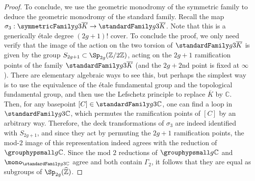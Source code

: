 \begin{proof}
	To conclude, we use the geometric monodromy of the symmetric
	family to deduce the geometric monodromy of the standard family.
	Recall the map $\sigma_3: \symmetricFamily g 3 {\overline K} \rightarrow \standardFamily g 3 {\overline K}$.
	Note that this is a generically \'etale degree $(2g+1)!$ cover.
	To conclude the proof, we only need verify that the image of the 
	action on the two torsion of $\standardFamily g 3 {\overline K}$
	is given by the group 
	$S_{2g+1} \subset \Sp_{2g}(\mathbb Z/2 \mathbb Z)$,
	acting on the
	$2g+1$ ramification
	points of the family $\standardFamily g 3 {\overline K}$ (and the $2g+2$nd point
	is fixed at $\infty$).
	There are elementary algebraic ways to see this, but perhaps
	the simplest way is to use the equivalence of the \'etale
	fundamental group and the topological fundamental group,
	and then use the Lefschetz principle to replace $\overline K$
	by $\mathbb C$.
	Then, for any basepoint $[C] \in\standardFamily g 3 {\mathbb C}$,
one can find a loop in $\standardFamily g 3 {\mathbb C}$,
which permutes the ramification points of $[C]$ by an arbitrary way.
Therefore, the deck transformations of $\sigma_3$ are indeed identified
with $S_{2g+1}$, and since they act by permuting the $2g+1$ 
ramification points, the mod-$2$ image of this representation indeed
agrees with the reduction of $\grouphypsmall g {\mathbb C}$.
Since the mod $2$ reductions of $\grouphypsmall g {\mathbb C}$
and $\mono_{\standardFamily g 3 {\mathbb C}}$ agree and
both contain $\Gamma_2$, it follows that they are equal as subgroups
of $\Sp_{2g}(\widehat{\mathbb Z})$.
	\end{proof}



